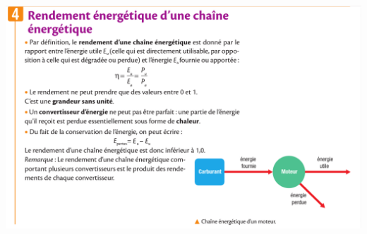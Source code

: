 \documentclass[10pt]{article}
\begin{document}
\begin{center}
	\includegraphics[scale=0.38]{4.png}
\end{center}
\end{document}
